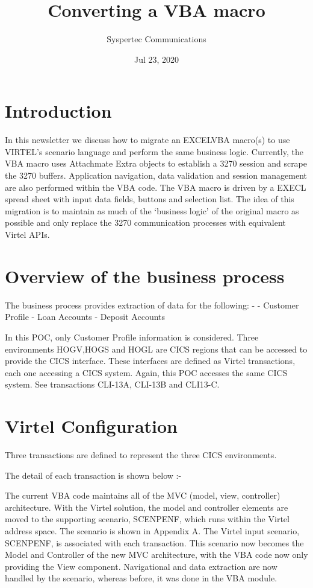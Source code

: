 \documentclass[letterpaper,10pt,english]{sphinxmanual}
\title{Converting a VBA macro}
\date{Jul 23, 2020}
\author{Syspertec Communications}
\begin{document}
\pagestyle{empty}
\sphinxmaketitle
\pagestyle{plain}
\sphinxtableofcontents
\pagestyle{normal}
\label{\detokenize{TN202001::doc}}



\chapter{Introduction}
\label{\detokenize{TN202001:introduction}}
In this newsletter we discuss how to migrate an EXCELVBA macro(s) to use VIRTEL’s scenario language and perform the same business logic. Currently, the VBA macro uses Attachmate Extra objects to establish a 3270 session and scrape the 3270 buffers. Application navigation, data validation and session management are also performed within the VBA code.  The VBA macro is driven by a EXECL spread sheet with input data fields, buttons and selection list. The idea of this migration is to maintain as much of the ‘business logic’ of the original macro as possible and only replace the 3270 communication processes with equivalent Virtel APIs.


\chapter{Overview of the business process}
\label{\detokenize{TN202001:overview-of-the-business-process}}
The business process provides extraction of data for the following: -
- Customer Profile
- Loan Accounts
- Deposit Accounts

In this POC, only Customer Profile information is considered. Three environments HOGV,HOGS and HOGL are CICS regions that can be accessed to provide the CICS interface. These interfaces are defined as Virtel transactions, each one accessing a CICS system. Again, this POC accesses the same CICS system. See transactions CLI-13A, CLI-13B and CLI13-C.


\chapter{Virtel Configuration}
\label{\detokenize{TN202001:virtel-configuration}}
Three transactions are defined to represent the three CICS environments.


The detail of each transaction is shown below :-


The current VBA code maintains all of the MVC (model, view, controller) architecture. With the Virtel solution, the model and controller elements are moved to the supporting scenario, SCENPENF, which runs within the Virtel address space. The scenario is shown in Appendix A. The Virtel input scenario, SCENPENF, is associated with each transaction. This scenario now becomes the Model and Controller of the new MVC architecture, with the VBA code now only providing the View component. Navigational and data extraction are now handled by the scenario, whereas before, it was done in the VBA module.
\end{document}
